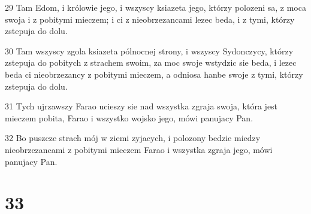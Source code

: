 \par 29 Tam Edom, i królowie jego, i wszyscy ksiazeta jego, którzy polozeni sa, z moca swoja i z pobitymi mieczem; i ci z nieobrzezancami lezec beda, i z tymi, którzy zstepuja do dolu.
\par 30 Tam wszyscy zgola ksiazeta pólnocnej strony, i wszyscy Sydonczycy, którzy zstepuja do pobitych z strachem swoim, za moc swoje wstydzic sie beda, i lezec beda ci nieobrzezancy z pobitymi mieczem, a odniosa hanbe swoje z tymi, którzy zstepuja do dolu.
\par 31 Tych ujrzawszy Farao ucieszy sie nad wszystka zgraja swoja, która jest mieczem pobita, Farao i wszystko wojsko jego, mówi panujacy Pan.
\par 32 Bo puszcze strach mój w ziemi zyjacych, i polozony bedzie miedzy nieobrzezancami z pobitymi mieczem Farao i wszystka zgraja jego, mówi panujacy Pan.

\chapter{33}

